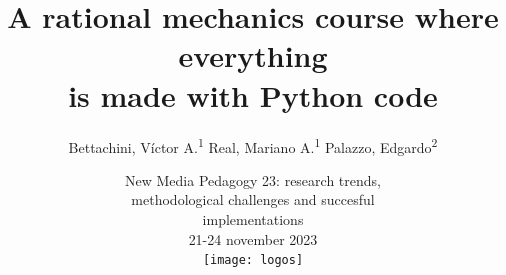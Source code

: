 \documentclass[aspectratio=169]{beamer}
\begin{document}
\title[A code centred mechanics subject]{A rational mechanics course where everything\\is made with Python code}
\author[vbettachini@unlam.edu.ar]{Bettachini, Víctor A.\textsuperscript{1} Real, Mariano A.\textsuperscript{1} Palazzo, Edgardo\textsuperscript{2}}
\date[2023-11-23]{
	New Media Pedagogy 23: research trends,\\ methodological challenges and succesful\\ implementations\\
	21-24 november 2023\\
	\texttt{[image: logos]}
}



\begin{frame}
  \titlepage
\end{frame}


\end{document}
